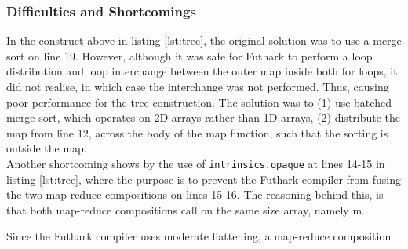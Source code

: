 \subsubsection{Difficulties and Shortcomings}
\label{sec:treediff}
In the construct above in listing \ref{lst:tree}, the original solution was to use a merge sort on line 19. However, although it was safe for Futhark to perform a loop distribution and loop interchange between the outer map inside both for loops, it did not realise, in which case the interchange was not performed. Thus, causing poor performance for the tree construction.  The solution was to (1) use batched merge sort, which operates on 2D arrays rather than 1D arrays, (2) distribute the map from line 12, across the body of the map function, such that the sorting is outside the map. 
\\[2mm]
Another shortcoming shows by the use of \texttt{intrinsics.opaque} at lines 14-15 in listing \ref{lst:tree}, where the purpose is to prevent the Futhark compiler from fusing the two map-reduce compositions on lines 15-16. The reasoning behind this, is that both map-reduce compositions call on the same size array, namely m. 

Since the Futhark compiler uses moderate flattening, a map-reduce composition 


















	



